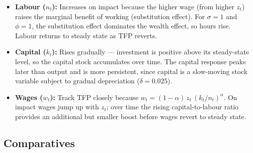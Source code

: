 \documentclass[dvipsnames,11pt]{article}
\begin{document}
\begin{enumerate}
\begin{solution}
\begin{itemize}
                        \item \textbf{Labour ($n_t$):} Increases on impact because the higher wage (from higher $z_t$) raises the marginal benefit of working (substitution effect).  For $\sigma=1$ and $\phi=1$, the substitution effect dominates the wealth effect, so hours rise.  Labour returns to steady state as TFP reverts.
                    
                        \item \textbf{Capital ($k_t$):} Rises gradually — investment is positive above its steady-state level, so the capital stock accumulates over time.  The capital response peaks later than output and is more persistent, since capital is a slow-moving stock variable subject to gradual depreciation ($\delta=0.025$).
                    
                        \item \textbf{Wages ($w_t$):} Track TFP closely because $w_t = (1-\alpha)\,z_t\,(k_t/n_t)^{\alpha}$.  On impact wages jump up with $z_t$; over time the rising capital-to-labour ratio provides an additional but smaller boost before wages revert to steady state.
                    \end{itemize}
                    
                \end{solution}
    
            \end{enumerate}

    \subsection{Comparatives}
    
\end{document}

